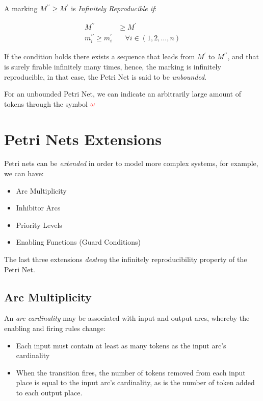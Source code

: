 \documentclass[openright, twoside, twocolumn]{report}
\begin{document}
    A marking $M^{\prime\prime} \geq  M^\prime$ is \emph{Infinitely Reproducible if}:

    \begin{align}
      M^{\prime\prime}  &\geq  M^\prime\\
      m_i^{\prime\prime}  \geq  m_i^\prime &\quad  \forall  i \in  (1, 2, \ldots, n)
    \end{align}

    If the condition holds there exists a sequence that leads from $M^\prime$ to $M^{\prime\prime}$, and that is surely firable infinitely many times, hence, the marking is infinitely reproducible, in that case, the Petri Net is said to be \emph{unbounded}.

    For an unbounded Petri Net, we can indicate an arbitrarily large amount of tokens through
    the symbol $\textcolor{red}{\omega} $

    \section{Petri Nets Extensions}

    Petri nets can be \emph{extended} in order to model more complex systems, for example, we can have:

    \begin{itemize}
      \item Arc Multiplicity
      \item Inhibitor Arcs
      \item Priority Levels
      \item Enabling Functions (Guard Conditions)
    \end{itemize}

    \begin{remark}
      The last three extensions \emph{destroy} the infinitely reproducibility property of the Petri Net.
    \end{remark}

    \subsection{Arc Multiplicity}

    An \emph{arc cardinality} may be associated with input and output arcs, whereby the enabling and firing
    rules change:

    \begin{itemize}
      \item Each input must contain at least as many tokens as the input arc's cardinality
      \item When the transition fires, the number of tokens removed from each input place is equal to the input arc's cardinality,
      as is the number of token added to each output place.
    \end{itemize}
\end{document}
